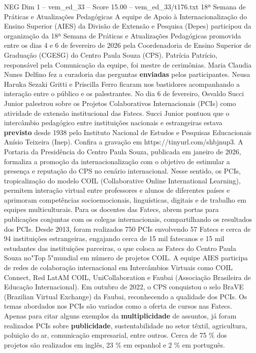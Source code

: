 \begin{textsample}{NEG Dim 1 – vem\_ed\_33 – Score 15.00 – vem\_ed\_33/t176.txt}  \label{ex:f1_neg_111}
18ª Semana de Práticas e Atualizações Pedagógicas A equipe de Apoio à Internacionalização do Ensino Superior (AIES) da Divisão de Extensão e Pesquisa (Depes) participou da organização da 18ª Semana de Práticas e Atualizações Pedagógicas promovida entre os dias 4 e 6 de fevereiro de 2026 pela Coordenadoria de Ensino Superior de Graduação (CGESG) do Centro Paula Souza (CPS).
Patrícia Patrício, responsável pela Comunicação da equipe, foi mestre de cerimônias.
Maria Claudia Nunes Delfino fez a curadoria das perguntas \textbf{enviadas} pelos participantes.
Neusa Haruka Sezaki Gritti e Priscilla Ferro ficaram nos bastidores acompanhando a interação entre o público e os palestrantes.
No dia 6 de fevereiro, Osvaldo Succi Junior palestrou sobre os Projetos Colaborativos Internacionais (PCIs) como atividade de extensão institucional das Fatecs.
Succi Junior pontuou que o intercâmbio pedagógico entre instituições nacionais e estrangeiras estava \textbf{previsto} desde 1938 pelo Instituto Nacional de Estudos e Pesquisas Educacionais Anísio Teixeira (Inep).
Confira a gravação em https://tinyurl.com/shbjnup3.
A Portaria da Presidência do Centro Paula Souza, publicada em janeiro de 2026, formaliza a promoção da internacionalização com o objetivo de estimular a presença e reputação do CPS no cenário internacional.
Nesse sentido, os PCIs, tropicalização do modelo COIL (Collaborative Online International Learning), permitem interação virtual entre professores e alunos de diferentes países e aprimoram competências socioemocionais, linguísticas, digitais e de trabalho em equipes multiculturais.
Para os docentes das Fatecs, abrem portas para publicações conjuntas com os colegas internacionais, compartilhando os resultados dos PCIs.
Desde 2013, foram realizados 750 PCIs envolvendo 57 Fatecs e cerca de 94 instituições estrangeiras, engajando cerca de 15 mil fatecanos e 15 mil estudantes das instituições parceiras, o que coloca as Fatecs do Centro Paula Souza no"Top 5"mundial em número de projetos COIL.
A equipe AIES participa de redes de colaboração internacional em Intercâmbios Virtuais como COIL Connect, Red LatAM COIL, UniCollaboration e Faubai (Associação Brasileira de Educação Internacional).
Em outubro de 2022, o CPS conquistou o selo BraVE (Brazilian Virtual Exchange) da Faubai, reconhecendo a qualidade dos PCIs.
Os temas abordados nos PCIs são variados como a oferta de cursos nas Fatecs.
Apenas para citar alguns exemplos da \textbf{multiplicidade} de assuntos, já foram realizados PCIs sobre \textbf{publicidade}, sustentabilidade no setor têxtil, agricultura, poluição do ar, comunicação empresarial, entre outros.
Cerca de 75 \% dos projetos são realizados em inglês, 23 \% em espanhol e 2 \% em português.

\end{textsample}
